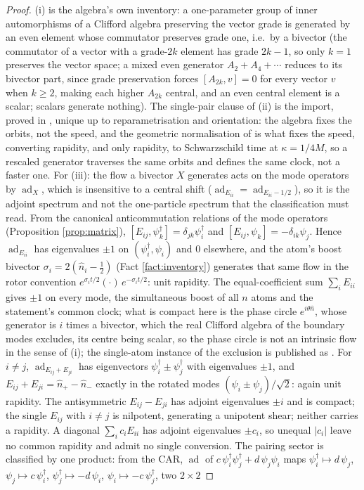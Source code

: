 \documentclass[11pt]{article}
\theoremstyle{definition}
\begin{document}
\begin{proof}
(i) is the algebra's own inventory: a one-parameter group of inner automorphisms of a Clifford algebra preserving the vector grade is generated by an even element whose commutator preserves grade one, i.e.\ by a bivector (the commutator of a vector with a grade-$2k$ element has grade $2k - 1$, so only $k = 1$ preserves the vector space; a mixed even generator $A_2 + A_4 + \cdots$ reduces to its bivector part, since grade preservation forces $[A_{2k}, v] = 0$ for every vector $v$ when $k \geq 2$, making each higher $A_{2k}$ central, and an even central element is a scalar; scalars generate nothing). The single-pair clause of (ii) is the import, proved in \cite[Prop.~2.1]{ButlerT7}, unique up to reparametrisation and orientation: the algebra fixes the orbits, not the speed, and the geometric normalisation of \cite[App.~A]{ButlerT5} is what fixes the speed, converting rapidity, and only rapidity, to Schwarzschild time at $\kappa = 1/4M$, so a rescaled generator traverses the same orbits and defines the same clock, not a faster one. For (iii): the flow a bivector $X$ generates acts on the mode operators by $\operatorname{ad}_X$, which is insensitive to a central shift ($\operatorname{ad}_{E_{ii}} = \operatorname{ad}_{E_{ii} - 1/2}$), so it is the adjoint spectrum and not the one-particle spectrum that the classification must read. From the canonical anticommutation relations of the mode operators (Proposition \ref{prop:matrix}), $[E_{ij}, \psi_k^\dagger] = \delta_{jk}\psi_i^\dagger$ and $[E_{ij}, \psi_k] = -\delta_{ik}\psi_j$. Hence $\operatorname{ad}_{E_{ii}}$ has eigenvalues $\pm 1$ on $(\psi_i^\dagger, \psi_i)$ and $0$ elsewhere, and the atom's boost bivector $\sigma_i = 2(\hat n_i - \tfrac12)$ (Fact \ref{fact:inventory}) generates that same flow in the rotor convention $e^{\sigma_i t/2}(\cdot)\,e^{-\sigma_i t/2}$: unit rapidity. The equal-coefficient sum $\sum_i E_{ii}$ gives $\pm 1$ on every mode, the simultaneous boost of all $n$ atoms and the statement's common clock; what is compact here is the phase circle $e^{i\theta \hat n}$, whose generator is $i$ times a bivector, which the real Clifford algebra of the boundary modes excludes, its centre being scalar, so the phase circle is not an intrinsic flow in the sense of (i); the single-atom instance of the exclusion is published as \cite[Prop.~7.21(3)]{ButlerT5}. For $i \neq j$, $\operatorname{ad}_{E_{ij} + E_{ji}}$ has eigenvectors $\psi_i^\dagger \pm \psi_j^\dagger$ with eigenvalues $\pm 1$, and $E_{ij} + E_{ji} = \hat n_+ - \hat n_-$ exactly in the rotated modes $(\psi_i \pm \psi_j)/\sqrt{2}$: again unit rapidity. The antisymmetric $E_{ij} - E_{ji}$ has adjoint eigenvalues $\pm i$ and is compact; the single $E_{ij}$ with $i \neq j$ is nilpotent, generating a unipotent shear; neither carries a rapidity. A diagonal $\sum_i c_i E_{ii}$ has adjoint eigenvalues $\pm c_i$, so unequal $|c_i|$ leave no common rapidity and admit no single conversion. The pairing sector is classified by one product: from the CAR, $\operatorname{ad}$ of $c\,\psi_i^\dagger\psi_j^\dagger + d\,\psi_j\psi_i$ maps $\psi_i^\dagger \mapsto d\,\psi_j$, $\psi_j \mapsto c\,\psi_i^\dagger$, $\psi_j^\dagger \mapsto -d\,\psi_i$, $\psi_i \mapsto -c\,\psi_j^\dagger$, two $2 \times 2$ 
\end{proof}
\end{document}
